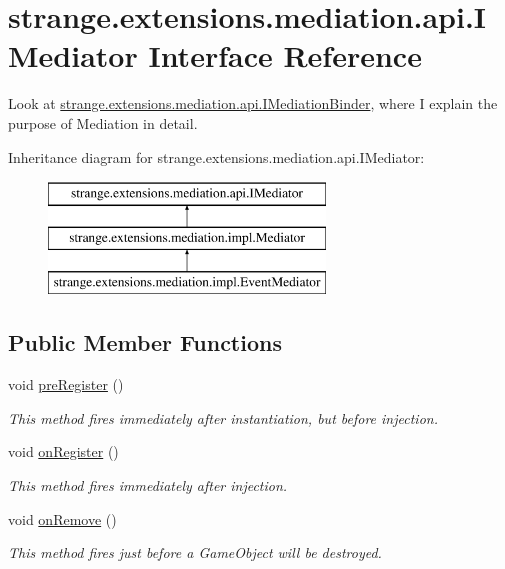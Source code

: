 \hypertarget{interfacestrange_1_1extensions_1_1mediation_1_1api_1_1_i_mediator}{\section{strange.\-extensions.\-mediation.\-api.\-I\-Mediator Interface Reference}
\label{interfacestrange_1_1extensions_1_1mediation_1_1api_1_1_i_mediator}
}


Look at \hyperlink{interfacestrange_1_1extensions_1_1mediation_1_1api_1_1_i_mediation_binder}{strange.\-extensions.\-mediation.\-api.\-I\-Mediation\-Binder}, where I explain the purpose of Mediation in detail.  


Inheritance diagram for strange.\-extensions.\-mediation.\-api.\-I\-Mediator\-:\begin{figure}[H]
\begin{center}
\leavevmode
\includegraphics[height=3.000000cm]{interfacestrange_1_1extensions_1_1mediation_1_1api_1_1_i_mediator}
\end{center}
\end{figure}
\subsection*{Public Member Functions}
\begin{DoxyCompactItemize}
\item 
void \hyperlink{interfacestrange_1_1extensions_1_1mediation_1_1api_1_1_i_mediator_a9965bc773cde6f889ec7528ade52267e}{pre\-Register} ()
\begin{DoxyCompactList}\small\item\em This method fires immediately after instantiation, but before injection. \end{DoxyCompactList}\item 
void \hyperlink{interfacestrange_1_1extensions_1_1mediation_1_1api_1_1_i_mediator_a84249d82961c687d821631718fc40cda}{on\-Register} ()
\begin{DoxyCompactList}\small\item\em This method fires immediately after injection. \end{DoxyCompactList}\item 
void \hyperlink{interfacestrange_1_1extensions_1_1mediation_1_1api_1_1_i_mediator_a7d1c9db89dbe71b80f0fb56fd3012def}{on\-Remove} ()
\begin{DoxyCompactList}\small\item\em This method fires just before a Game\-Object will be destroyed. \end{DoxyCompactList}\end{DoxyCompactItemize}

